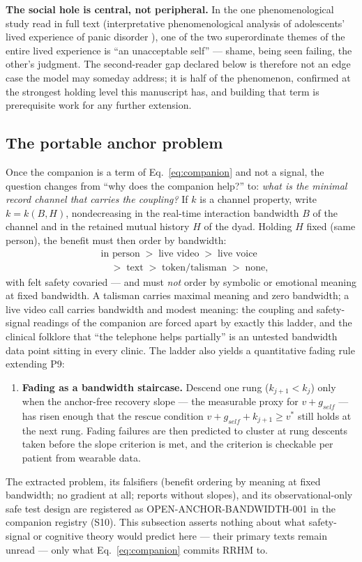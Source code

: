 \documentclass[9pt,twocolumn]{article}
\begin{document}
\textbf{The social hole is central, not peripheral.} In the one phenomenological study read in full text (interpretative phenomenological analysis of adolescents' lived experience of panic disorder \cite{baker2022}), one of the two superordinate themes of the entire lived experience is ``an unacceptable self'' --- shame, being seen failing, the other's judgment. The second-reader gap declared below is therefore not an edge case the model may someday address; it is half of the phenomenon, confirmed at the strongest holding level this manuscript has, and building that term is prerequisite work for any further extension.

\subsection{The portable anchor problem}
\label{sec:panchor}
Once the companion is a term of Eq.~\ref{eq:companion} and not a signal, the question changes from ``why does the companion help?'' to: \emph{what is the minimal record channel that carries the coupling?} If $k$ is a channel property, write $k=k(B,H)$, nondecreasing in the real-time interaction bandwidth $B$ of the channel and in the retained mutual history $H$ of the dyad. Holding $H$ fixed (same person), the benefit must then order by bandwidth:
\begin{align*}
&\text{in person} \;>\; \text{live video} \;>\; \text{live voice}\\[-0.15em]
&\quad>\; \text{text} \;>\; \text{token/talisman} \;>\; \text{none},
\end{align*}
with felt safety covaried --- and must \emph{not} order by symbolic or emotional meaning at fixed bandwidth. A talisman carries maximal meaning and zero bandwidth; a live video call carries bandwidth and modest meaning: the coupling and safety-signal readings of the companion are forced apart by exactly this ladder, and the clinical folklore that ``the telephone helps partially'' is an untested bandwidth data point sitting in every clinic. The ladder also yields a quantitative fading rule extending P9:
\begin{enumerate}[leftmargin=1.6em]
\item[P10] \textbf{Fading as a bandwidth staircase.} Descend one rung ($k_{j+1}<k_j$) only when the anchor-free recovery slope --- the measurable proxy for $v+g_{self}$ --- has risen enough that the rescue condition $v+g_{self}+k_{j+1}\ge v^{*}$ still holds at the next rung. Fading failures are then predicted to cluster at rung descents taken before the slope criterion is met, and the criterion is checkable per patient from wearable data.
\end{enumerate}
The extracted problem, its falsifiers (benefit ordering by meaning at fixed bandwidth; no gradient at all; reports without slopes), and its observational-only safe test design are registered as OPEN-ANCHOR-BANDWIDTH-001 in the companion registry (S10). This subsection asserts nothing about what safety-signal or cognitive theory would predict here --- their primary texts remain unread --- only what Eq.~\ref{eq:companion} commits RRHM to.
\end{document}

